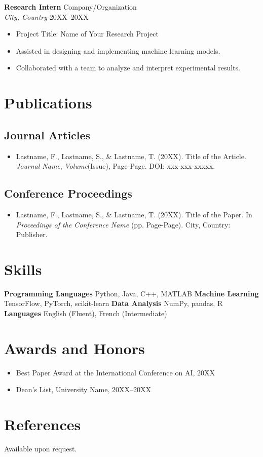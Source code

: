 \documentclass[11pt,a4paper]{article}
\newcommand{\cvsection}[1]{\section*{#1}}
\newcommand{\cvsubsection}[2]{\subsection*{#1 \hfill \normalsize{#2}}}
\newcommand{\cvitem}[2]{\textbf{#1} \hfill {#2}}
\newcommand{\cventry}[4]{\textbf{#1} \hfill {#2} \\ \textit{#3} \hfill {#4}}
\begin{document}
\cventry{Research Intern}{Company/Organization}{City, Country}{20XX--20XX}
\begin{itemize}[leftmargin=*, topsep=0pt, itemsep=0pt]
    \item Project Title: Name of Your Research Project
    \item Assisted in designing and implementing machine learning models.
    \item Collaborated with a team to analyze and interpret experimental results.
\end{itemize}

\cvsection{Publications}
\cvsubsection{Journal Articles}{}
\begin{itemize}[leftmargin=*, topsep=0pt, itemsep=0pt]
    \item Lastname, F., Lastname, S., \& Lastname, T. (20XX). Title of the Article. \textit{Journal Name}, \textit{Volume}(Issue), Page-Page. DOI: xxx-xxx-xxxxx.
\end{itemize}

\cvsubsection{Conference Proceedings}{}
\begin{itemize}[leftmargin=*, topsep=0pt, itemsep=0pt]
    \item Lastname, F., Lastname, S., \& Lastname, T. (20XX). Title of the Paper. In \textit{Proceedings of the Conference Name} (pp. Page-Page). City, Country: Publisher.
\end{itemize}

\cvsection{Skills}
\cvitem{Programming Languages}{Python, Java, C++, MATLAB}
\cvitem{Machine Learning}{TensorFlow, PyTorch, scikit-learn}
\cvitem{Data Analysis}{NumPy, pandas, R}
\cvitem{Languages}{English (Fluent), French (Intermediate)}

\cvsection{Awards and Honors}
\begin{itemize}[leftmargin=*, topsep=0pt, itemsep=0pt]
    \item Best Paper Award at the International Conference on AI, 20XX
    \item Dean's List, University Name, 20XX--20XX
\end{itemize}

\cvsection{References}
Available upon request.
\end{document}

